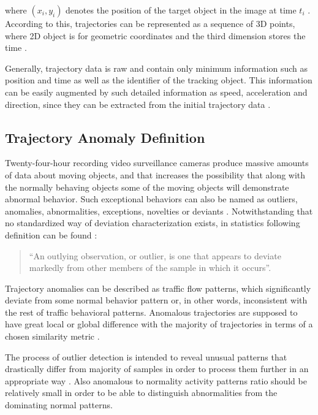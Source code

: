 where $(x_i, y_i)$ denotes the position of the target object in the image at time $t_i$ \cite{article:5_survey_tbsa}. According to this, trajectories can be represented as a sequence of 3D points, where 2D object is for geometric coordinates and the third dimension stores the time \cite{article:25_dhr_mvt_eesd}.

Generally, trajectory data is raw and contain only minimum information such as position and time as well as the identifier of the tracking object. This information can be easily augmented by such detailed information as speed, acceleration and direction, since they can be extracted from the initial trajectory data \cite{article:12_dssto_mot}.

\subsection{Trajectory Anomaly Definition}

Twenty-four-hour recording video surveillance cameras produce massive amounts of data about moving objects, and that increases the possibility that along with the normally behaving objects some of the moving objects will demonstrate abnormal behavior. Such exceptional behaviors can also be named as outliers, anomalies, abnormalities, exceptions, novelties or deviants \cite{article:11_eod_hdd}\cite{article:15_survey_ad}. Notwithstanding that no standardized way of deviation characterization exists, in statistics following definition can be found \cite{article:13_pdoos}:

\begin{quote}
	``An outlying observation, or outlier, is one that appears to deviate markedly from other members of the sample in which it occurs''.
\end{quote}

Trajectory anomalies can be described as traffic flow patterns, which significantly deviate from some normal behavior pattern or, in other words, inconsistent with the rest of traffic behavioral patterns. Anomalous trajectories are supposed to have great local or global difference with the majority of trajectories in terms of a chosen similarity metric \cite{article:over_tod}.
 
The process of outlier detection is intended to reveal unusual patterns that drastically differ from majority of samples in order to process them further in an appropriate way \cite{article:11_eod_hdd}. Also anomalous to normality activity patterns ratio should be relatively small in order to be able to distinguish abnormalities from the dominating normal patterns.

